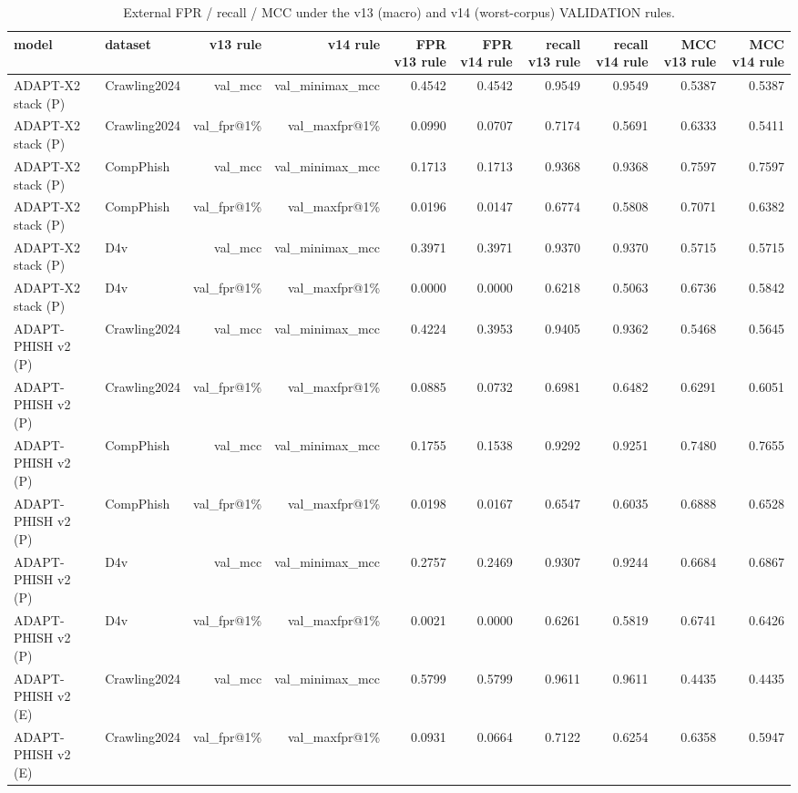 \begin{table}[t]
\centering
\scriptsize
\caption{External FPR / recall / MCC under the v13 (macro) and v14 (worst-corpus) VALIDATION rules.}
\label{tab:rev_R15_v14_threshold_rules}
\begin{tabular}{llrrrrrrrr}
\toprule
model & dataset & v13 rule & v14 rule & FPR v13 rule & FPR v14 rule & recall v13 rule & recall v14 rule & MCC v13 rule & MCC v14 rule \\
\midrule
ADAPT-X2 stack (P) & Crawling2024 & val\_mcc & val\_minimax\_mcc & 0.4542 & 0.4542 & 0.9549 & 0.9549 & 0.5387 & 0.5387 \\
ADAPT-X2 stack (P) & Crawling2024 & val\_fpr@1\% & val\_maxfpr@1\% & 0.0990 & 0.0707 & 0.7174 & 0.5691 & 0.6333 & 0.5411 \\
ADAPT-X2 stack (P) & CompPhish & val\_mcc & val\_minimax\_mcc & 0.1713 & 0.1713 & 0.9368 & 0.9368 & 0.7597 & 0.7597 \\
ADAPT-X2 stack (P) & CompPhish & val\_fpr@1\% & val\_maxfpr@1\% & 0.0196 & 0.0147 & 0.6774 & 0.5808 & 0.7071 & 0.6382 \\
ADAPT-X2 stack (P) & D4v & val\_mcc & val\_minimax\_mcc & 0.3971 & 0.3971 & 0.9370 & 0.9370 & 0.5715 & 0.5715 \\
ADAPT-X2 stack (P) & D4v & val\_fpr@1\% & val\_maxfpr@1\% & 0.0000 & 0.0000 & 0.6218 & 0.5063 & 0.6736 & 0.5842 \\
ADAPT-PHISH v2 (P) & Crawling2024 & val\_mcc & val\_minimax\_mcc & 0.4224 & 0.3953 & 0.9405 & 0.9362 & 0.5468 & 0.5645 \\
ADAPT-PHISH v2 (P) & Crawling2024 & val\_fpr@1\% & val\_maxfpr@1\% & 0.0885 & 0.0732 & 0.6981 & 0.6482 & 0.6291 & 0.6051 \\
ADAPT-PHISH v2 (P) & CompPhish & val\_mcc & val\_minimax\_mcc & 0.1755 & 0.1538 & 0.9292 & 0.9251 & 0.7480 & 0.7655 \\
ADAPT-PHISH v2 (P) & CompPhish & val\_fpr@1\% & val\_maxfpr@1\% & 0.0198 & 0.0167 & 0.6547 & 0.6035 & 0.6888 & 0.6528 \\
ADAPT-PHISH v2 (P) & D4v & val\_mcc & val\_minimax\_mcc & 0.2757 & 0.2469 & 0.9307 & 0.9244 & 0.6684 & 0.6867 \\
ADAPT-PHISH v2 (P) & D4v & val\_fpr@1\% & val\_maxfpr@1\% & 0.0021 & 0.0000 & 0.6261 & 0.5819 & 0.6741 & 0.6426 \\
ADAPT-PHISH v2 (E) & Crawling2024 & val\_mcc & val\_minimax\_mcc & 0.5799 & 0.5799 & 0.9611 & 0.9611 & 0.4435 & 0.4435 \\
ADAPT-PHISH v2 (E) & Crawling2024 & val\_fpr@1\% & val\_maxfpr@1\% & 0.0931 & 0.0664 & 0.7122 & 0.6254 & 0.6358 & 0.5947 \\

\end{tabular}
\end{table}
